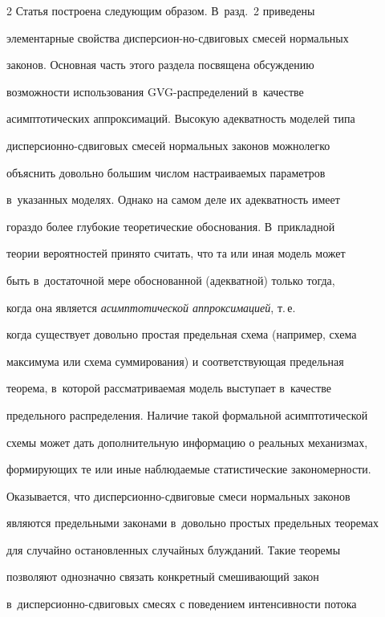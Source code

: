 \begin{multicols}{2}
Статья построена следующим образом. В~разд.~2 приведены


элементарные свойства дисперси\-он-\linebreak но-сдвиговых смесей нормальных


законов. Основная часть этого раздела посвящена обсуждению\linebreak


возможности использования GVG-рас\-пре\-де\-ле\-ний в~качестве


асимптотических аппроксимаций. Высокую адекватность моделей типа


дис\-пер\-си\-он\-но-сдви\-го\-вых смесей нормальных законов можно\linebreak легко


объяснить довольно большим числом настраиваемых параметров 


в~указанных моделях. Однако на самом деле их адекватность имеет


гораздо более глубокие теоретические обоснования. В~прикладной


теории вероятностей принято считать, что та или иная модель может


быть в~достаточной мере обоснованной (адекватной) только тогда,


когда она является {\it асимптотической аппроксимацией}, т.\,е.\


когда существует довольно простая предельная схема (например, схема


максимума или схема суммирования) и соответствующая предельная


теорема, в~которой рассматриваемая модель выступает в~качестве


предельного распределения. Наличие такой формальной асимптотической


схемы может дать дополнительную информацию о реальных механизмах,


формирующих те или иные наблюдаемые статистические закономерности.


Оказывается, что дис\-пер\-си\-он\-но-сдви\-го\-вые смеси нормальных законов


являются предельными законами в~довольно простых предельных теоремах


для случайно остановленных случайных блужданий. Такие теоремы


позволяют однозначно связать конкретный смешивающий закон 


в~дис\-пер\-си\-он\-но-сдви\-го\-вых смесях с поведением интенсивности потока



\end{multicols}

